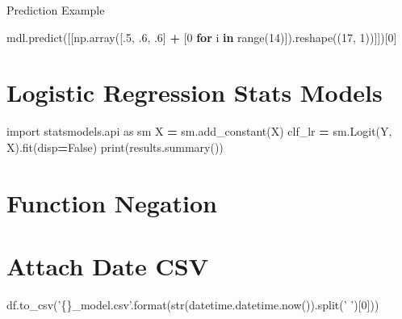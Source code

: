 \documentclass[]{book}
\newenvironment{Shaded}{\begin{snugshade}}{\end{snugshade}}
\newcommand{\KeywordTok}[1]{\textcolor[rgb]{0.13,0.29,0.53}{\textbf{#1}}}
\newcommand{\DecValTok}[1]{\textcolor[rgb]{0.00,0.00,0.81}{#1}}
\newcommand{\SpecialCharTok}[1]{\textcolor[rgb]{0.00,0.00,0.00}{#1}}
\newcommand{\StringTok}[1]{\textcolor[rgb]{0.31,0.60,0.02}{#1}}
\newcommand{\ImportTok}[1]{#1}
\newcommand{\VariableTok}[1]{\textcolor[rgb]{0.00,0.00,0.00}{#1}}
\newcommand{\ControlFlowTok}[1]{\textcolor[rgb]{0.13,0.29,0.53}{\textbf{#1}}}
\newcommand{\OperatorTok}[1]{\textcolor[rgb]{0.81,0.36,0.00}{\textbf{#1}}}
\newcommand{\BuiltInTok}[1]{#1}
\newcommand{\NormalTok}[1]{#1}
\begin{document}
Prediction Example

\begin{Shaded}
\begin{Highlighting}[]
\NormalTok{mdl.predict([[np.array([.}\DecValTok{5}\NormalTok{, .}\DecValTok{6}\NormalTok{, .}\DecValTok{6}\NormalTok{] }\OperatorTok{+}\NormalTok{ [}\DecValTok{0} \ControlFlowTok{for}\NormalTok{ i }\KeywordTok{in} \BuiltInTok{range}\NormalTok{(}\DecValTok{14}\NormalTok{)]).reshape((}\DecValTok{17}\NormalTok{, }\DecValTok{1}\NormalTok{))]])[}\DecValTok{0}\NormalTok{]}
\end{Highlighting}
\end{Shaded}

\section{Logistic Regression Stats
Models}\label{logistic-regression-stats-models}

\begin{Shaded}
\begin{Highlighting}[]
\ImportTok{import}\NormalTok{ statsmodels.api }\ImportTok{as}\NormalTok{ sm}
\NormalTok{X }\OperatorTok{=}\NormalTok{ sm.add_constant(X)}
\NormalTok{clf_lr }\OperatorTok{=}\NormalTok{ sm.Logit(Y, X).fit(disp}\OperatorTok{=}\VariableTok{False}\NormalTok{)}
\BuiltInTok{print}\NormalTok{(results.summary())}
\end{Highlighting}
\end{Shaded}

\section{Function Negation}\label{function-negation}

\begin{Shaded}
\end{Shaded}

\section{Attach Date CSV}\label{attach-date-csv}

\begin{Shaded}
\begin{Highlighting}[]
\NormalTok{df.to_csv(}\StringTok{'}\SpecialCharTok{\{\}}\StringTok{_model.csv'}\NormalTok{.}\BuiltInTok{format}\NormalTok{(}\BuiltInTok{str}\NormalTok{(datetime.datetime.now()).split(}\StringTok{' '}\NormalTok{)[}\DecValTok{0}\NormalTok{]))}
\end{Highlighting}
\end{Shaded}
\end{document}
